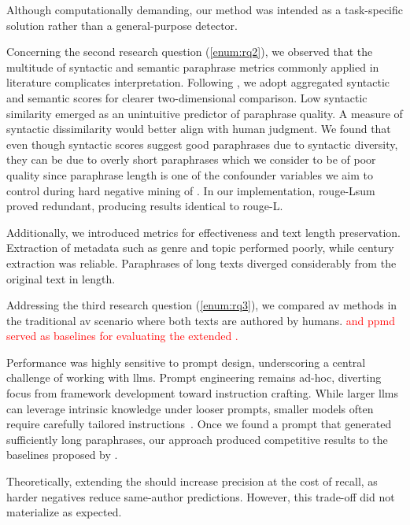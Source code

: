 Although computationally demanding, our method was intended as a task-specific solution rather than a general-purpose detector. 


Concerning the second research question (\autoref{enum:rq2}), we observed that the multitude of syntactic and semantic paraphrase metrics commonly applied in literature complicates interpretation. 
Following \citet{gohsen_captions_2023}, we adopt aggregated syntactic and semantic scores for clearer two-dimensional comparison.
Low syntactic similarity emerged as an unintuitive predictor of paraphrase quality.
A measure of syntactic dissimilarity would better align with human judgment. 
We found that even though syntactic scores suggest good paraphrases due to syntactic diversity, they can be due to overly short paraphrases which we consider to be of poor quality since paraphrase length is one of the confounder variables we aim to control during hard negative mining of \imps{}.
In our implementation, \ac{rouge}-Lsum proved redundant, producing results identical to \ac{rouge}-L.

Additionally, we introduced metrics for \pextractor{} effectiveness and text length preservation. 
Extraction of metadata such as genre and topic performed poorly, while century extraction was reliable. 
Paraphrases of long \dataGutenberg{} texts diverged considerably from the original text in length.

Addressing the third research question (\autoref{enum:rq3}), we compared \ac{av} methods in the traditional \ac{av} scenario where both texts are authored by humans. 
\textcolor{red}{\unmasking{} and \ac{ppmd} served as baselines for evaluating the extended \impAppr{}.} 

Performance was highly sensitive to prompt design, underscoring a central challenge of working with \acp{llm}. 
Prompt engineering remains ad-hoc, diverting focus from framework development toward instruction crafting. 
While larger \acp{llm} can leverage intrinsic knowledge under looser prompts, smaller models often require carefully tailored instructions~\citep{schmidt_llm_av_latin_24}. 
Once we found a prompt that generated sufficiently long paraphrases, our approach produced competitive results to the baselines proposed by \citet{koppel_determining_2014}. 

Theoretically, extending the \impAppr{} should increase precision at the cost of recall, as harder negatives reduce same-author predictions. 
However, this trade-off did not materialize as expected.
